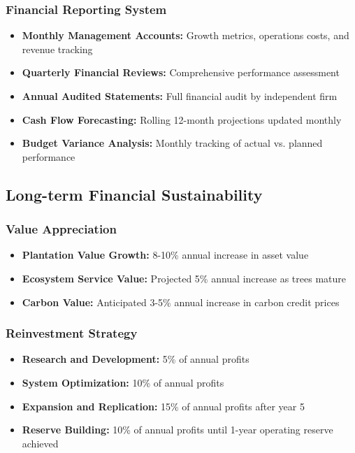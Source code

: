\subsubsection{Financial Reporting System}
\begin{itemize}
    \item \textbf{Monthly Management Accounts:} Growth metrics, operations costs, and revenue tracking
    \item \textbf{Quarterly Financial Reviews:} Comprehensive performance assessment
    \item \textbf{Annual Audited Statements:} Full financial audit by independent firm
    \item \textbf{Cash Flow Forecasting:} Rolling 12-month projections updated monthly
    \item \textbf{Budget Variance Analysis:} Monthly tracking of actual vs. planned performance
\end{itemize}

\subsection{Long-term Financial Sustainability}

\subsubsection{Value Appreciation}
\begin{itemize}
    \item \textbf{Plantation Value Growth:} 8-10\% annual increase in asset value
    \item \textbf{Ecosystem Service Value:} Projected 5\% annual increase as trees mature
    \item \textbf{Carbon Value:} Anticipated 3-5\% annual increase in carbon credit prices
\end{itemize}

\subsubsection{Reinvestment Strategy}
\begin{itemize}
    \item \textbf{Research and Development:} 5\% of annual profits
    \item \textbf{System Optimization:} 10\% of annual profits
    \item \textbf{Expansion and Replication:} 15\% of annual profits after year 5
    \item \textbf{Reserve Building:} 10\% of annual profits until 1-year operating reserve achieved
\end{itemize}
